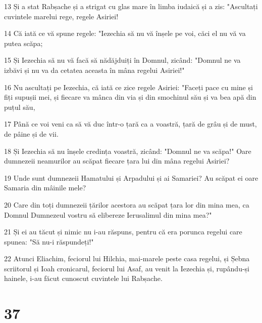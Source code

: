 \par 13 Și a stat Rabșache și a strigat cu glas mare în limba iudaică și a zis: "Ascultați cuvintele marelui rege, regele Asiriei!
\par 14 Că iată ce vă spune regele: "Iezechia să nu vă înșele pe voi, căci el nu vă va putea scăpa;
\par 15 Și Iezechia să nu vă facă să nădăjduiți în Domnul, zicând: "Domnul ne va izbăvi și nu va da cetatea aceasta în mâna regelui Asiriei!"
\par 16 Nu ascultați pe Iezechia, că iată ce zice regele Asiriei: "Faceți pace cu mine și fiți supușii mei, și fiecare va mânca din via și din smochinul său și va bea apă din puțul său,
\par 17 Până ce voi veni ca să vă duc într-o țară ca a voastră, țară de grâu și de must, de pâine și de vii.
\par 18 Și Iezechia să nu înșele credința voastră, zicând: "Domnul ne va scăpa!" Oare dumnezeii neamurilor au scăpat fiecare țara lui din mâna regelui Asiriei?
\par 19 Unde sunt dumnezeii Hamatului și Arpadului și ai Samariei? Au scăpat ei oare Samaria din mâinile mele?
\par 20 Care din toți dumnezeii țărilor acestora au scăpat țara lor din mina mea, ca Domnul Dumnezeul vostru să elibereze Ierusalimul din mina mea?"
\par 21 Și ei au tăcut și nimic nu i-au răspuns, pentru că era porunca regelui care spunea: "Să nu-i răspundeți!"
\par 22 Atunci Eliachim, feciorul lui Hilchia, mai-marele peste casa regelui, și Șebna scriitorul și Ioah cronicarul, feciorul lui Asaf, au venit la Iezechia și, rupându-și hainele, i-au făcut cunoscut cuvintele lui Rabșache.

\chapter{37}

